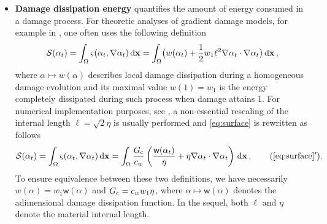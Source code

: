 \begin{itemize}
\item \textbf{Damage dissipation energy} quantifies the amount of energy consumed in a damage process. For theoretic analyses of gradient damage models, for example in \cite{PhamAmorMarigoMaurini:2011,SicsicMarigo:2013}, one often uses the following definition
\begin{equation} \label{eq:surface}
\mathcal{S}(\alpha_t)=\int_\Omega\varsigma(\alpha_t,\nabla\alpha_t)\dx=\int_\Omega\bigl(w(\alpha_t)+\frac{1}{2}w_1\ell^2\nabla\alpha_t\cdot\nabla\alpha_t\bigr)\dx\,,
\end{equation}
where $\alpha\mapsto w(\alpha)$ describes local damage dissipation during a homogeneous damage evolution and its maximal value $w(1)=w_1$ is the energy completely dissipated during such process when damage attains 1. For numerical implementation purposes, see \cite{BourdinMarigoMauriniSicsic:2014,MesgarnejadBourdinKhonsari:2014}, a non-essential rescaling of the internal length $\ell=\sqrt{2}\eta$ is usually performed and \eqref{eq:surface} is rewritten as follows
\begin{align} \label{eq:surfaceGc}
\mathcal{S}(\alpha_t)=\int_\Omega\varsigma(\alpha_t,\nabla\alpha_t)\dx=\int_\Omega\frac{\gc}{c_w}\left(\frac{\mathsf{w}(\alpha_t)}{\eta}+\eta\nabla\alpha_t\cdot\nabla\alpha_t\right)\dx\,,\tag{\ref*{eq:surface}${}^\prime$}.
\end{align}
To ensure equivalence between these two definitions, we have necessarily $w(\alpha)=w_1\mathsf{w}(\alpha)$ and $G_\mathrm{c}=c_ww_1\eta$, where $\alpha\mapsto\mathsf{w}(\alpha)$ denotes the adimensional damage dissipation function. In the sequel, both $\ell$ and $\eta$ denote the material internal length.
\end{itemize}

